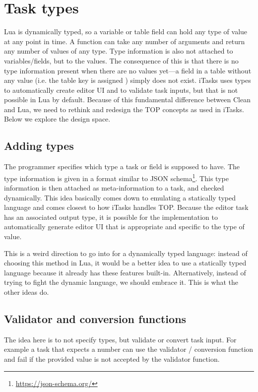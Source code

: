 \section{Task types}\label{section-types}
Lua is dynamically typed, so a variable or table field can hold any type of value at any point in time. A function can take any number of arguments and return any number of values of any type. Type information is also not attached to variables/fields, but to the values. The consequence of this is that there is no type information present when there are no values yet---a field in a table without any value (i.e. the table key is assigned ) simply does not exist.
iTasks uses types to automatically create editor UI and to validate task inputs, but that is not possible in Lua by default. Because of this fundamental difference between Clean and Lua, we need to rethink and redesign the TOP concepts as used in iTasks. Below we explore the design space.

\subsection{Adding types}\label{section-types-adding}
The programmer specifies which type a task or field is supposed to have. The type information is given in a format similar to JSON schema\footnote{\label{footnote-json-schema}\url{https://json-schema.org/}}. This type information is then attached as meta-information to a task, and checked dynamically. This idea basically comes down to emulating a statically typed language and comes closest to how iTasks handles TOP. Because the editor task has an associated output type, it is possible for the implementation to automatically generate editor UI that is appropriate and specific to the type of value.

This is a weird direction to go into for a dynamically typed language: instead of choosing this method in Lua, it would be a better idea to use a statically typed language because it already has these features built-in. Alternatively, instead of trying to fight the dynamic language, we should embrace it. This is what the other ideas do.

\subsection{Validator and conversion functions}\label{section-types-validator-conversion}
The idea here is to not specify types, but validate or convert task input. For example a task that expects a number can use the  validator / conversion function and fail if the provided value is not accepted by the validator function.

